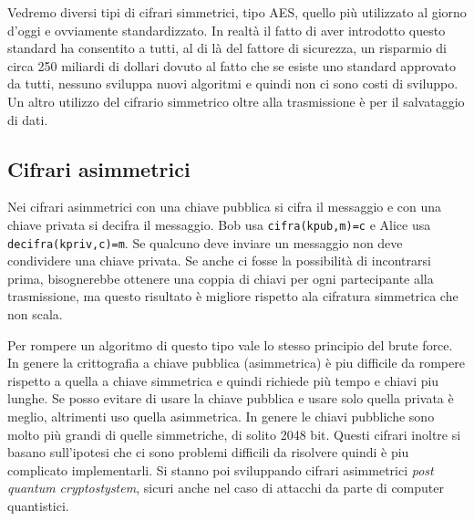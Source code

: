 Vedremo diversi tipi di cifrari simmetrici, tipo AES, quello più utilizzato al giorno d'oggi e ovviamente standardizzato. In realtà il fatto di aver introdotto questo standard ha consentito a tutti, al di là del fattore di sicurezza, un risparmio di circa 250 miliardi di dollari dovuto al fatto che se esiste uno standard approvato da tutti, nessuno sviluppa nuovi algoritmi e quindi non ci sono costi di sviluppo.  Un altro utilizzo del cifrario simmetrico oltre alla trasmissione è per il salvataggio di dati.

\subsection{Cifrari asimmetrici}
Nei cifrari asimmetrici con una chiave pubblica si cifra il messaggio e con una chiave privata si decifra il messaggio.  Bob usa \texttt{cifra(kpub,m)=c} e Alice usa \texttt{decifra(kpriv,c)=m}. Se qualcuno deve inviare un messaggio non deve condividere una chiave privata. Se anche ci fosse la possibilità di incontrarsi prima, bisognerebbe ottenere una coppia di chiavi per ogni partecipante alla trasmissione, ma questo risultato è migliore rispetto ala cifratura simmetrica che non scala.


\vspace{5mm}

Per rompere un algoritmo di questo tipo vale lo stesso principio del brute force.
In genere la crittografia a chiave pubblica (asimmetrica) è piu difficile da rompere rispetto a quella  a chiave simmetrica e quindi richiede più tempo e chiavi piu lunghe. Se posso evitare di usare la chiave pubblica e usare solo quella privata è meglio, altrimenti uso quella asimmetrica. In genere le chiavi pubbliche sono molto più grandi di quelle simmetriche, di solito 2048 bit. Questi cifrari inoltre si basano sull'ipotesi che ci sono problemi difficili da risolvere quindi è piu complicato implementarli. Si stanno poi sviluppando cifrari asimmetrici \textit{post quantum cryptostystem}, sicuri anche nel caso di attacchi da parte di computer quantistici. 

